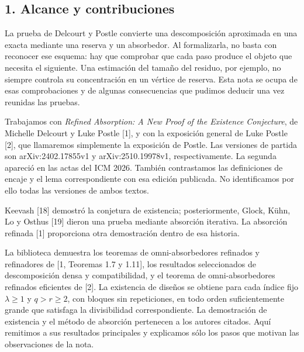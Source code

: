 \documentclass[spanish,11pt,a4paper]{article}
\begin{document}
\subsection{1. Alcance y contribuciones}\label{alcance-y-contribuciones}

La prueba de Delcourt y Postle convierte una descomposición aproximada en una exacta mediante una reserva y un absorbedor. Al formalizarla, no basta con reconocer ese esquema: hay que comprobar que cada paso produce el objeto que necesita el siguiente. Una estimación del tamaño del residuo, por ejemplo, no siempre controla su concentración en un vértice de reserva. Esta nota se ocupa de esas comprobaciones y de algunas consecuencias que pudimos deducir una vez reunidas las pruebas.

Trabajamos con \emph{Refined Absorption: A New Proof of the Existence Conjecture}, de Michelle Delcourt y Luke Postle {[}1{]}, y con la exposición general de Luke Postle {[}2{]}, que llamaremos simplemente la exposición de Postle. Las versiones de partida son arXiv:2402.17855v1 y arXiv:2510.19978v1, respectivamente. La segunda apareció en las actas del ICM 2026. También contrastamos las definiciones de encaje y el lema correspondiente con esa edición publicada. No identificamos por ello todas las versiones de ambos textos.

Keevash {[}18{]} demostró la conjetura de existencia; posteriormente, Glock, Kühn, Lo y Osthus {[}19{]} dieron una prueba mediante absorción iterativa. La absorción refinada {[}1{]} proporciona otra demostración dentro de esa historia.

La biblioteca demuestra los teoremas de omni-absorbedores refinados y refinadores de {[}1, Teoremas 1.7 y 1.11{]}, los resultados seleccionados de descomposición densa y compatibilidad, y el teorema de omni-absorbedores refinados eficientes de {[}2{]}. La existencia de diseños se obtiene para cada índice fijo \(\lambda\ge1\) y \(q>r\ge2\), con bloques sin repeticiones, en todo orden suficientemente grande que satisfaga la divisibilidad correspondiente. La demostración de existencia y el método de absorción pertenecen a los autores citados. Aquí remitimos a sus resultados principales y explicamos sólo los pasos que motivan las observaciones de la nota.
\end{document}
